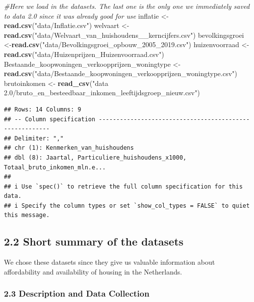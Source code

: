\documentclass[
]{article}
\newenvironment{Shaded}{\begin{snugshade}}{\end{snugshade}}
\newcommand{\CommentTok}[1]{\textcolor[rgb]{0.56,0.35,0.01}{\textit{#1}}}
\newcommand{\FunctionTok}[1]{\textcolor[rgb]{0.13,0.29,0.53}{\textbf{#1}}}
\newcommand{\NormalTok}[1]{#1}
\newcommand{\OtherTok}[1]{\textcolor[rgb]{0.56,0.35,0.01}{#1}}
\newcommand{\StringTok}[1]{\textcolor[rgb]{0.31,0.60,0.02}{#1}}
\begin{document}
\begin{Shaded}
\begin{Highlighting}[]
\CommentTok{\#Here we load in the datasets. The last one is the only one we immediately saved to data 2.0 since it was already good for use}
\NormalTok{inflatie }\OtherTok{\textless{}{-}} \FunctionTok{read.csv}\NormalTok{(}\StringTok{"data/Inflatie.csv"}\NormalTok{)}
\NormalTok{welvaart }\OtherTok{\textless{}{-}} \FunctionTok{read.csv}\NormalTok{(}\StringTok{"data/Welvaart\_van\_huishoudens\_\_kerncijfers.csv"}\NormalTok{)}
\NormalTok{bevolkingsgroei }\OtherTok{\textless{}{-}}\FunctionTok{read.csv}\NormalTok{(}\StringTok{"data/Bevolkingsgroei\_opbouw\_2005\_2019.csv"}\NormalTok{)}
\NormalTok{huizenvoorraad }\OtherTok{\textless{}{-}}\FunctionTok{read.csv}\NormalTok{(}\StringTok{"data/Huizenprijzen\_Huizenvoorraad.csv"}\NormalTok{)}
\NormalTok{Bestaande\_koopwoningen\_verkoopprijzen\_woningtype }\OtherTok{\textless{}{-}} \FunctionTok{read.csv}\NormalTok{(}\StringTok{"data/Bestaande\_koopwoningen\_verkoopprijzen\_woningtype.csv"}\NormalTok{)}
\NormalTok{brutoinkomen }\OtherTok{\textless{}{-}} \FunctionTok{read\_csv}\NormalTok{(}\StringTok{"data 2.0/bruto\_en\_besteedbaar\_inkomen\_leeftijdsgroep\_nieuw.csv"}\NormalTok{)}
\end{Highlighting}
\end{Shaded}

\begin{verbatim}
## Rows: 14 Columns: 9
## -- Column specification --------------------------------------------------------
## Delimiter: ","
## chr (1): Kenmerken_van_huishoudens
## dbl (8): Jaartal, Particuliere_huishoudens_x1000, Totaal_bruto_inkomen_mln.e...
## 
## i Use `spec()` to retrieve the full column specification for this data.
## i Specify the column types or set `show_col_types = FALSE` to quiet this message.
\end{verbatim}

\subsection{2.2 Short summary of the
datasets}\label{short-summary-of-the-datasets}

We chose these datasets since they give us valuable information about
affordability and availability of housing in the Netherlands.

\subsubsection{2.3 Description and Data
Collection}\label{description-and-data-collection}
\end{document}
